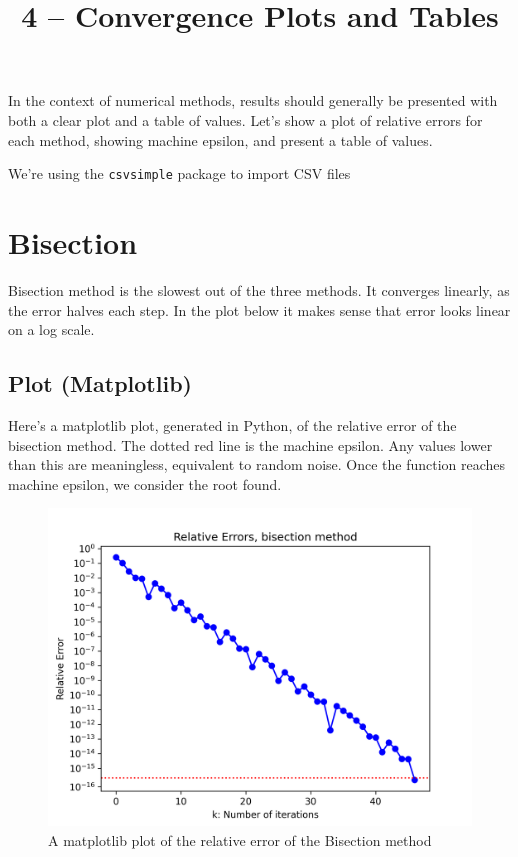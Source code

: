 \documentclass{article}
\title{4 -- Convergence Plots and Tables}
\begin{document}
\maketitle

In the context of numerical methods, results should generally be presented
with both a clear plot and a table of values. Let's show a plot of relative
errors for each method, showing machine epsilon, and present a table of values.

We're using the \texttt{csvsimple} package to import CSV files

\section{Bisection}

Bisection method is the slowest out of the three methods. It converges
linearly, as the error halves each step. In the plot below it makes sense
that error looks linear on a log scale.

\newpage
\subsection{Plot (Matplotlib)}

Here's a matplotlib plot, generated in Python, of the relative error of the
bisection method. The dotted red line is the machine epsilon. Any values lower
than this are meaningless, equivalent to random noise. Once the function
reaches machine epsilon, we consider the root found.

\begin{figure}[h]
    \centering
    \includegraphics[scale=0.7]{./plots/bisectionrel.png}
    \caption {A matplotlib plot of the relative error of the Bisection method}
\end{figure}
\end{document}
